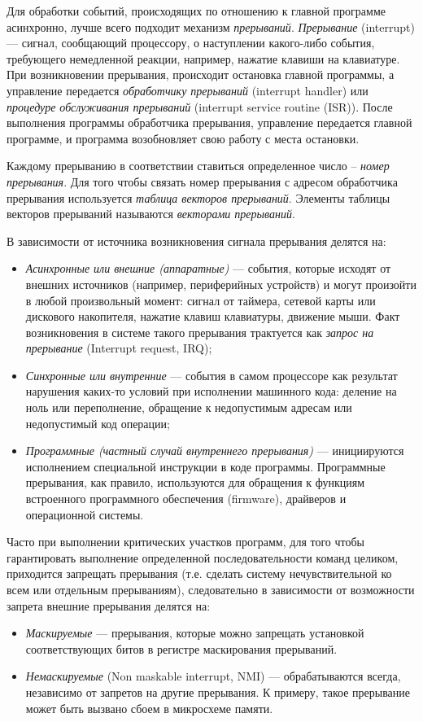 Для обработки событий, происходящих по отношению к главной программе асинхронно, лучше всего подходит механизм \textit{прерываний}. \textit{Прерывание} (interrupt) --- сигнал, сообщающий процессору, о наступлении какого-либо события, требующего немедленной реакции, например, нажатие клавиши на клавиатуре. При возникновении прерывания, происходит остановка главной программы, а управление передается \textit{обработчику прерываний} (interrupt handler) или \textit{процедуре обслуживания прерываний} (interrupt service routine (ISR)). После выполнения программы обработчика прерывания, управление передается главной программе, и программа возобновляет свою работу с места остановки.

Каждому прерыванию в соответствии ставиться определенное число -- \textit{номер прерывания}. Для того чтобы связать номер прерывания с адресом обработчика прерывания используется \textit{таблица векторов прерываний}. Элементы таблицы векторов прерываний называются \textit{векторами прерываний}. 

В зависимости от источника возникновения сигнала прерывания делятся на:
\begin{itemize}
\item \textit{Асинхронные или внешние (аппаратные)} --- события, которые исходят от внешних источников (например, периферийных устройств) и могут произойти в любой произвольный момент: сигнал от таймера, сетевой карты или дискового накопителя, нажатие клавиш клавиатуры, движение мыши. Факт возникновения в системе такого прерывания трактуется как \textit{запрос на прерывание} (Interrupt request, IRQ);
\item \textit{Синхронные или внутренние} --- события в самом процессоре как результат нарушения каких-то условий при исполнении машинного кода: деление на ноль или переполнение, обращение к недопустимым адресам или недопустимый код операции;
\item\textit{ Программные (частный случай внутреннего прерывания)} --- инициируются исполнением специальной инструкции в коде программы. Программные прерывания, как правило, используются для обращения к функциям встроенного программного обеспечения (firmware), драйверов и операционной системы.
\end{itemize}

Часто при выполнении критических участков программ, для того чтобы гарантировать выполнение определенной последовательности команд целиком, приходится запрещать прерывания (т.е. сделать систему нечувствительной ко всем или отдельным прерываниям), следовательно в зависимости от возможности запрета внешние прерывания делятся на:
\begin{itemize}
\item \textit{ Маскируемые} --- прерывания, которые можно запрещать установкой соответствующих битов в регистре маскирования прерываний. 
\item \textit{ Немаскируемые} (Non maskable interrupt, NMI) --- обрабатываются всегда, независимо от запретов на другие прерывания. К примеру, такое прерывание может быть вызвано сбоем в микросхеме памяти.
\end{itemize}

